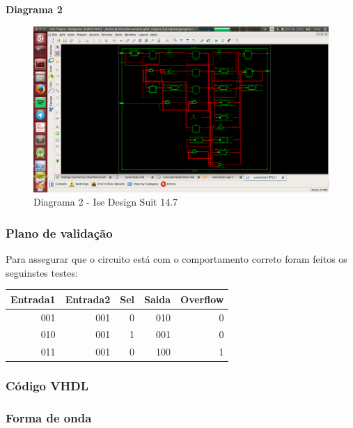 \documentclass[12pts]{article}
\begin{document}
\newpage
\textbf{Diagrama 2 }

\begin{figure}[!htb]
  \centering
  \includegraphics[scale=0.3	]{imagens/somaSub2}
  \caption{Diagrama 2 - Ise Design Suit 14.7}
  \label{figRotulo}
\end{figure}


\subsubsection{Plano de validação}

Para assegurar que o circuito está com o comportamento correto foram feitos os seguinstes testes:

\begin{center}
	\begin{tabular}{|r|r|r|r|r|}
		\hline
		Entrada1 & Entrada2 & Sel & Saida & Overflow\\
		\hline
		001 & 001 & 0 & 010 & 0\\
		\hline
		010 & 001 & 1 & 001 & 0\\
		\hline
		011 & 001 & 0 & 100 & 1\\
		\hline
	\end{tabular}
\end{center}

\newpage
\subsubsection{Código VHDL}



\newpage
\subsubsection{Forma de onda}
\end{document}
